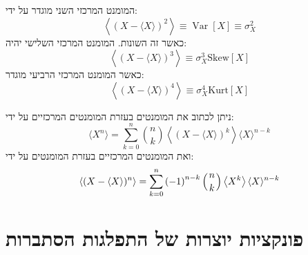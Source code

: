 \documentclass{tstextbook}
\begin{document}
\begin{example}
המומנט המרכזי השני מוגדר על ידי:
$$\left\langle\left(X-\langle X\rangle\right)^{2}\right\rangle\equiv\operatorname{Var}\left[X\right]\equiv\sigma_{X}^{2}$$
כאשר זה השונות. המומנט המרכזי השלישי יהיה:
$$\left\langle\left(X-\langle X\rangle\right)^{3}\right\rangle\equiv\sigma_{X}^{3}\mathrm{Skew}\left[X\right]$$
כאשר המומנט המרכזי הרביעי מוגדר:
$$\left\langle\left(X-\langle X\rangle\right)^{4}\right\rangle\equiv\sigma_{X}^{4}\mathrm{Kurt}\left[X\right]$$

\end{example}
\begin{proposition}
ניתן לכתוב את המומנטים בעזרת המומנטים המרכזיים על ידי:
$$\langle X^{n}\rangle=\sum_{k=0}^{n}{\binom{n}{k}}\left\langle(X-\langle X\rangle)^{k}\right\rangle\langle X\rangle^{n-k}$$
ואת המומנטים המרכזיים בעזרת המומנטים על ידי:
$$\left\langle(X-\langle X\rangle)^{n}\right\rangle=\sum_{k=0}^{n}{(-1)}^{n-k}\left({n\atop k}\right)\left\langle X^{k}\right\rangle\langle X\rangle^{n-k}$$

\end{proposition}
\section{פונקציות יוצרות של התפלגות הסתברות}
\end{document}
